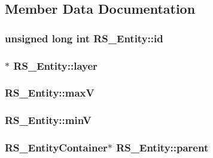 \subsection{Member Data Documentation}
\hypertarget{class_r_s___entity_a491c2b6d300c8dcb8fad96abf2eb547d}{
\subsubsection[{id}]{\setlength{\rightskip}{0pt plus 5cm}unsigned long int R\-S\-\_\-\-Entity\-::id\hspace{0.3cm}{\ttfamily [protected]}}}\label{class_r_s___entity_a491c2b6d300c8dcb8fad96abf2eb547d}
\hypertarget{class_r_s___entity_a6e738a0a081f97b9923787777e639b27}{
\subsubsection[{layer}]{$\ast$ R\-S\-\_\-\-Entity\-::layer\hspace{0.3cm}{\ttfamily [protected]}}}\label{class_r_s___entity_a6e738a0a081f97b9923787777e639b27}
\hypertarget{class_r_s___entity_a43e0b8304f11fa91e079f0dcaad9f73a}{
\subsubsection[{max\-V}]{ R\-S\-\_\-\-Entity\-::max\-V\hspace{0.3cm}{\ttfamily [protected]}}}\label{class_r_s___entity_a43e0b8304f11fa91e079f0dcaad9f73a}
\hypertarget{class_r_s___entity_a4c88d3b694aac7189c05df009b48ee72}{
\subsubsection[{min\-V}]{ R\-S\-\_\-\-Entity\-::min\-V\hspace{0.3cm}{\ttfamily [protected]}}}\label{class_r_s___entity_a4c88d3b694aac7189c05df009b48ee72}
\hypertarget{class_r_s___entity_a80358a8d2fc6739a516a278dc500b49f}{
\subsubsection[{parent}]{\setlength{\rightskip}{0pt plus 5cm}R\-S\-\_\-\-Entity\-Container$\ast$ R\-S\-\_\-\-Entity\-::parent\hspace{0.3cm}{\ttfamily [protected]}}}\label{class_r_s___entity_a80358a8d2fc6739a516a278dc500b49f}
